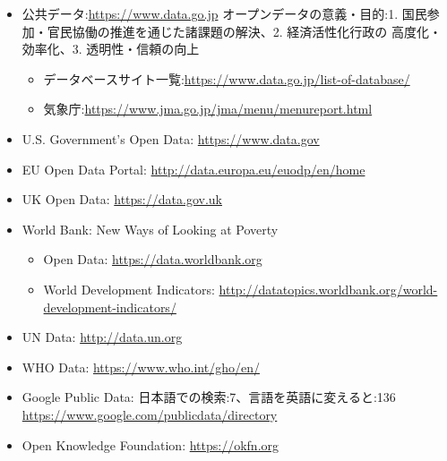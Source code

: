\documentclass[
]{book}
\providecommand{\tightlist}{%
  \setlength{\itemsep}{0pt}\setlength{\parskip}{0pt}}
\theoremstyle{definition}
\theoremstyle{definition}
\theoremstyle{definition}
\theoremstyle{definition}
\theoremstyle{remark}
\begin{document}
\begin{itemize}
\item
  公共データ:\url{https://www.data.go.jp}
  オープンデータの意義・目的:1. 国民参加・官民協働の推進を通じた諸課題の解決、2. 経済活性化行政の 高度化・効率化、3. 透明性・信頼の向上

  \begin{itemize}
  \tightlist
  \item
    データベースサイト一覧:\url{https://www.data.go.jp/list-of-database/}\\
  \item
    気象庁:\url{https://www.jma.go.jp/jma/menu/menureport.html}
  \end{itemize}
\item
  U.S. Government's Open Data: \url{https://www.data.gov}
\item
  EU Open Data Portal: \url{http://data.europa.eu/euodp/en/home}
\item
  UK Open Data: \url{https://data.gov.uk}
\item
  World Bank: New Ways of Looking at Poverty

  \begin{itemize}
  \tightlist
  \item
    Open Data: \url{https://data.worldbank.org}
  \item
    World Development Indicators: \url{http://datatopics.worldbank.org/world-development-indicators/}
  \end{itemize}
\item
  UN Data: \url{http://data.un.org}
\item
  WHO Data: \url{https://www.who.int/gho/en/}
\item
  Google Public Data: 日本語での検索:7、言語を英語に変えると:136 \url{https://www.google.com/publicdata/directory}
\item
  Open Knowledge Foundation: \url{https://okfn.org}


\end{itemize}
\end{document}
